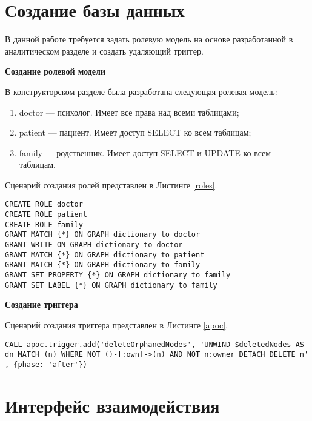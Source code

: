 \section{Создание базы данных}

В данной работе требуется задать ролевую модель на основе разработанной в аналитическом разделе и создать удаляющий триггер.

\textbf{Создание ролевой модели}

В конструкторском разделе была разработана следующая ролевая модель:
\begin{enumerate}[label=\arabic*.]
	\item doctor --- психолог. Имеет все права над всеми таблицами;
	\item patient --- пациент. Имеет доступ SELECT ко всем таблицам;
	\item family --- родственник. Имеет доступ SELECT и UPDATE ко всем таблицам.
\end{enumerate}

Сценарий создания ролей представлен в Листинге \ref{roles}.
\begin{center}
	\begin{lstlisting}[label=roles, caption=Создание ролевой модели]
CREATE ROLE doctor
CREATE ROLE patient
CREATE ROLE family
GRANT MATCH {*} ON GRAPH dictionary to doctor
GRANT WRITE ON GRAPH dictionary to doctor
GRANT MATCH {*} ON GRAPH dictionary to patient
GRANT MATCH {*} ON GRAPH dictionary to family
GRANT SET PROPERTY {*} ON GRAPH dictionary to family
GRANT SET LABEL {*} ON GRAPH dictionary to family
\end{lstlisting}
\end{center}

\textbf{Создание триггера}

Сценарий создания триггера представлен в Листинге \ref{apoc}.
\begin{center}
	\begin{lstlisting}[label=apoc, caption=Создание триггера]
CALL apoc.trigger.add('deleteOrphanedNodes', 'UNWIND $deletedNodes AS dn MATCH (n) WHERE NOT ()-[:own]->(n) AND NOT n:owner DETACH DELETE n' , {phase: 'after'})
\end{lstlisting}
\end{center}

\pagebreak

\section{Интерфейс взаимодействия}

